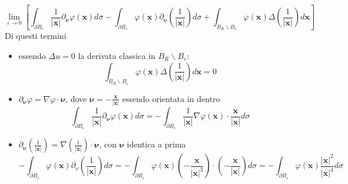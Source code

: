 \documentclass[10pt,a4paper,twoside,openright]{book}
\begin{document}
\begin{equation}
\lim _{\varepsilon \rightarrow 0}\left[\int _{\partial B_{\varepsilon }}\frac{1}{| \mathbf{x}| } \partial _{\bm{\nu }} \varphi (\mathbf{x}) d\sigma -\int _{\partial B_{\varepsilon }} \varphi (\mathbf{x}) \partial _{\bm{\nu }}\left(\frac{1}{| \mathbf{x}| }\right) d\sigma +\int _{B_{R} \backslash B_{\varepsilon }} \varphi (\mathbf{x}) \Delta \left(\frac{1}{| \mathbf{x}| }\right) d\mathbf{x}\right]
\label{eq:esempio-derivata-limite-2}
\end{equation}
Di questi termini
\begin{itemize}
\item essendo $\displaystyle \Delta u=0$ la derivata classica in $\displaystyle B_{R} \backslash B_{\varepsilon }$:\begin{equation*}
\int _{B_{R} \backslash B_{\varepsilon }} \varphi (\mathbf{x}) \Delta \left(\frac{1}{| \mathbf{x}| }\right) d\mathbf{x} =0
\end{equation*}
\item  $\displaystyle \partial _{\bm{\nu }} \varphi =\nabla \varphi \cdotp \bm{\nu }$, dove $\displaystyle \bm{\nu } =-\frac{\mathbf{x}}{| \mathbf{x}| }$ essendo orientata in dentro\begin{equation*}
\int _{\partial B_{\varepsilon }}\frac{1}{| \mathbf{x}| } \partial _{\bm{\nu }} \varphi (\mathbf{x}) d\sigma =-\int _{\partial B_{\varepsilon }}\frac{1}{| \mathbf{x}| } \nabla \varphi (\mathbf{x}) \cdotp \frac{\mathbf{x}}{| \mathbf{x}| } d\sigma 
\end{equation*}
\item $\displaystyle \partial _{\bm{\nu }}\left(\frac{1}{| \mathbf{x}| }\right) =\nabla \left(\frac{1}{| \mathbf{x}| }\right) \cdotp \bm{\nu }$, con $\displaystyle \bm{\nu }$ identica a prima\begin{equation*}
-\int _{\partial B_{\varepsilon }} \varphi (\mathbf{x}) \partial _{\nu }\left(\frac{1}{| \mathbf{x}| }\right) d\sigma =-\int _{\partial B_{\varepsilon }} \varphi (\mathbf{x})\left( -\frac{\mathbf{x}}{| \mathbf{x}| ^{3}}\right) \cdotp \left( -\frac{\mathbf{x}}{| \mathbf{x}| }\right) d\sigma =-\int _{\partial B_{\varepsilon }} \varphi (\mathbf{x})\frac{| \mathbf{x}| ^{2}}{| \mathbf{x}| ^{4}} d\sigma 
\end{equation*}
\end{itemize}
\end{document}
